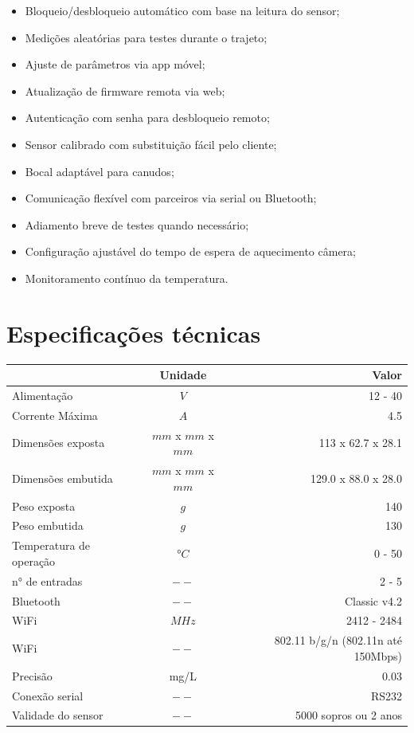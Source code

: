 \documentclass[a4paper,12pt,oneside,pdflatex,italian,final,twocolumn]{article}
\begin{document}
\begin{itemize}
\item Bloqueio/desbloqueio automático com base na leitura do sensor;
\item Medições aleatórias para testes durante o trajeto;
\item Ajuste de parâmetros via app móvel;
\item Atualização de firmware remota via web;
\item Autenticação com senha para desbloqueio remoto;
\item Sensor calibrado com substituição fácil pelo cliente;
\item Bocal adaptável para canudos;
\item Comunicação flexível com parceiros via serial ou Bluetooth;
\item Adiamento breve de testes quando necessário;
\item Configuração ajustável do tempo de espera de aquecimento câmera;
\item Monitoramento contínuo da temperatura.
\end{itemize}

\section{Especificações técnicas}
\centering
\begin{tabular}{lcr}
\toprule
 & Unidade & Valor \\
\midrule
Alimentação & $V$ & 12 - 40 \\
Corrente Máxima & $A$ & 4.5 \\
Dimensões exposta & $mm$ x $mm$ x $mm$ & 113 x 62.7 x 28.1  \\
Dimensões embutida & $mm$ x $mm$ x $mm$ & 129.0 x 88.0 x 28.0 \\
Peso exposta & $g$ & 140 \\
Peso embutida & $g$ & 130 \\
Temperatura de operação & $°C$ & 0 - 50\\
n° de entradas & $--$ & 2 - 5 \\
Bluetooth & $--$ & Classic v4.2 \\
WiFi & $MHz$ & 2412 - 2484 \\
WiFi & $--$ & 802.11 b/g/n (802.11n até 150Mbps) \\
Precisão & mg/L & 0.03 \\
Conexão serial & $--$ & RS232 \\
Validade do sensor & $--$ & 5000 sopros ou 2 anos \\
\bottomrule
\end{tabular}
\end{document}
